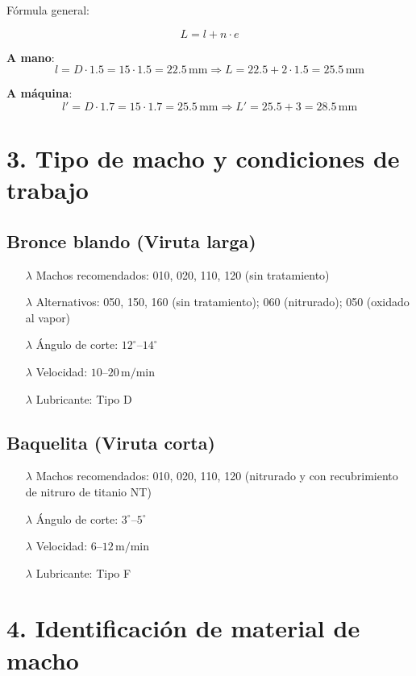 \documentclass[a4paper,12pt]{article}
\begin{document}
Fórmula general:

\[
L = l + n \cdot e
\]

\textbf{A mano}:
\[
l = D \cdot 1.5 = 15 \cdot 1.5 = 22.5\,\text{mm}
\Rightarrow L = 22.5 + 2 \cdot 1.5 = 25.5\,\text{mm}
\]

\textbf{A máquina}:
\[
l' = D \cdot 1.7 = 15 \cdot 1.7 = 25.5\,\text{mm}
\Rightarrow L' = 25.5 + 3 = 28.5\,\text{mm}
\]

\section*{3. Tipo de macho y condiciones de trabajo}

\subsection*{Bronce blando (Viruta larga)}

\begin{itemize}
\item[$\lambda$] Machos recomendados: 010, 020, 110, 120 (sin tratamiento)
\item[$\lambda$] Alternativos: 050, 150, 160 (sin tratamiento); 060 (nitrurado); 050 (oxidado al vapor)
\item[$\lambda$] Ángulo de corte: $12^\circ$–$14^\circ$
\item[$\lambda$] Velocidad: $10$–$20\,\text{m/min}$
\item[$\lambda$] Lubricante: Tipo D
\end{itemize}

\subsection*{Baquelita (Viruta corta)}

\begin{itemize}
\item[$\lambda$] Machos recomendados: 010, 020, 110, 120 (nitrurado y con recubrimiento de nitruro de titanio NT)
\item[$\lambda$] Ángulo de corte: $3^\circ$–$5^\circ$
\item[$\lambda$] Velocidad: $6$–$12\,\text{m/min}$
\item[$\lambda$] Lubricante: Tipo F
\end{itemize}

\section*{4. Identificación de material de macho}
\end{document}
